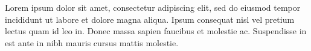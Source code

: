 

\begin{cvparagraph}

	Lorem ipsum dolor sit amet, consectetur adipiscing elit, sed do eiusmod tempor incididunt ut labore et dolore magna aliqua. Ipsum consequat nisl vel pretium lectus quam id leo in. Donec massa sapien faucibus et molestie ac. Suspendisse in est ante in nibh mauris cursus mattis molestie.


\end{cvparagraph}
